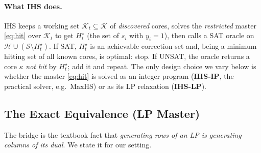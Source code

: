 \paragraph{What IHS does.} IHS keeps a working set $\mathcal{K}_t \subseteq
\mathcal{K}$ of \emph{discovered} cores, solves the \emph{restricted} master
\eqref{eq:hit} over $\mathcal{K}_t$ to get $H_t^\star$ (the set of $s_i$ with
$y_i = 1$), then calls a SAT oracle on $\mathcal{H} \cup (\mathcal{S} \setminus
H_t^\star)$. If SAT, $H_t^\star$ is an achievable correction set and, being a
minimum hitting set of all known cores, is optimal: stop. If UNSAT, the oracle
returns a core $\kappa$ \emph{not hit} by $H_t^\star$; add it and repeat. The
only design choice we vary below is whether the master \eqref{eq:hit} is solved
as an integer program (\textbf{IHS-IP}, the practical solver, e.g.\ MaxHS) or as
its LP relaxation (\textbf{IHS-LP}).

\subsection{The Exact Equivalence (LP Master)}
\label{sec:equiv}

The bridge is the textbook fact that \emph{generating rows of an LP is
generating columns of its dual}. We state it for our setting.


